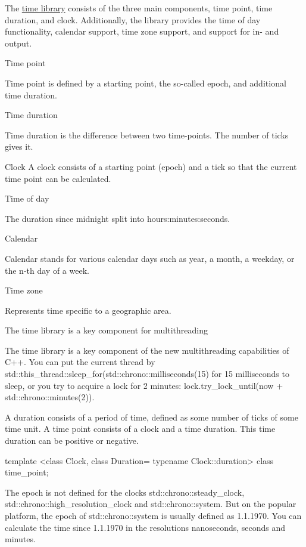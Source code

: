 The \href{http://en.cppreference.com/w/cpp/header/chrono}{time library} consists of the three main components, time point, time duration, and clock. Additionally, the library provides the time of day functionality, calendar support, time zone support, and support for in- and output.

\noindent
Time point 

Time point is defined by a starting point, the so-called epoch, and additional time duration.

\noindent
Time duration 

Time duration is the difference between two time-points. The number of ticks gives it.

\noindent
Clock 
A clock consists of a starting point (epoch) and a tick so that the current time point can be calculated.

\noindent
Time of day

The duration since midnight split into hours:minutes:seconds.

\noindent
Calendar 

Calendar stands for various calendar days such as year, a month, a weekday, or the n-th day of a week.

\noindent
Time zone 

Represents time specific to a geographic area.

\begin{myNotic}{The time library is a key component for multithreading}
	
The time library is a key component of the new multithreading capabilities of C++. You can put the current thread by std::this\_thread::sleep\_for(std::chrono::milliseconds(15) for 15 milliseconds to sleep, or you try to acquire a lock for 2 minutes: lock.try\_lock\_until(now + std::chrono::minutes(2)).
	
\end{myNotic}



A duration consists of a period of time, defined as some number of ticks of some time unit. A time point consists of a clock and a time duration. This time duration can be positive or negative.

\begin{cpp}
template <class Clock, class Duration= typename Clock::duration> class time_point;
\end{cpp}

The epoch is not defined for the clocks std::chrono::steady\_clock, std::chrono::high\_resolution\_clock and std::chrono::system. But on the popular platform, the epoch of std::chrono::system is usually defined as 1.1.1970. You can calculate the time since 1.1.1970 in the resolutions nanoseconds, seconds and minutes.

